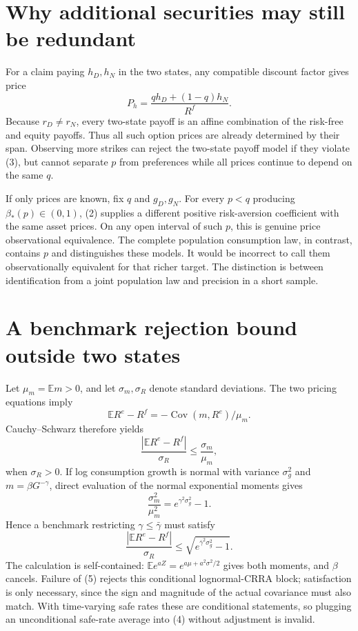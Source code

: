 \documentclass[11pt,a4paper]{article}
\newcommand{\E}{\mathbb E}
\DeclareMathOperator{\Cov}{Cov}
\begin{document}
\section{Why additional securities may still be redundant}
For a claim paying $h_D,h_N$ in the two states, any compatible discount factor gives price
\[
 P_h=\frac{qh_D+(1-q)h_N}{R^f}.                            \tag{3}
\]
Because $r_D\ne r_N$, every two-state payoff is an affine combination of the risk-free and equity payoffs. Thus all such option prices are already determined by their span. Observing more strikes can reject the two-state payoff model if they violate (3), but cannot separate $p$ from preferences while all prices continue to depend on the same $q$.

If only prices are known, fix $q$ and $g_D,g_N$. For every $p<q$ producing $\beta_*(p)\in(0,1)$, (2) supplies a different positive risk-aversion coefficient with the same asset prices. On any open interval of such $p$, this is genuine price observational equivalence. The complete population consumption law, in contrast, contains $p$ and distinguishes these models. It would be incorrect to call them observationally equivalent for that richer target. The distinction is between identification from a joint population law and precision in a short sample.

\section{A benchmark rejection bound outside two states}
Let $\mu_m=\E m>0$, and let $\sigma_m,\sigma_R$ denote standard deviations. The two pricing equations imply
\[
 \E R^e-R^f=-\Cov(m,R^e)/\mu_m.
\]
Cauchy--Schwarz therefore yields
\[
 \frac{|\E R^e-R^f|}{\sigma_R}\le\frac{\sigma_m}{\mu_m},     \tag{4}
\]
when $\sigma_R>0$. If log consumption growth is normal with variance $\sigma_g^2$ and $m=\beta G^{-\gamma}$, direct evaluation of the normal exponential moments gives
\[
 \frac{\sigma_m^2}{\mu_m^2}=e^{\gamma^2\sigma_g^2}-1.
\]
Hence a benchmark restricting $\gamma\le\bar\gamma$ must satisfy
\[
 \frac{|\E R^e-R^f|}{\sigma_R}
 \le\sqrt{e^{\bar\gamma^2\sigma_g^2}-1}.                    \tag{5}
\]
The calculation is self-contained: $\E e^{aZ}=e^{a\mu+a^2\sigma^2/2}$ gives both moments, and $\beta$ cancels. Failure of (5) rejects this conditional lognormal-CRRA block; satisfaction is only necessary, since the sign and magnitude of the actual covariance must also match. With time-varying safe rates these are conditional statements, so plugging an unconditional safe-rate average into (4) without adjustment is invalid.
\end{document}
